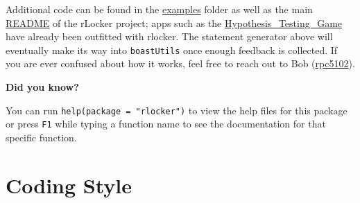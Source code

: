 \documentclass[
]{book}
\newenvironment{Shaded}{\begin{snugshade}}{\end{snugshade}}
\newcommand{\CommentTok}[1]{\textcolor[rgb]{0.56,0.35,0.01}{\textit{#1}}}
\newcommand{\DataTypeTok}[1]{\textcolor[rgb]{0.13,0.29,0.53}{#1}}
\newcommand{\KeywordTok}[1]{\textcolor[rgb]{0.13,0.29,0.53}{\textbf{#1}}}
\newcommand{\NormalTok}[1]{#1}
\newcommand{\OperatorTok}[1]{\textcolor[rgb]{0.81,0.36,0.00}{\textbf{#1}}}
\newcommand{\OtherTok}[1]{\textcolor[rgb]{0.56,0.35,0.01}{#1}}
\newcommand{\RegionMarkerTok}[1]{#1}
\newcommand{\StringTok}[1]{\textcolor[rgb]{0.31,0.60,0.02}{#1}}
\begin{document}
\begin{Shaded}
\end{Shaded}

Additional code can be found in the \href{https://github.com/rpc5102/rlocker/tree/master/inst/examples}{examples} folder as well as the main \href{https://github.com/rpc5102/rlocker/blob/master/README.md}{README} of the rLocker project; apps such as the \href{https://github.com/EducationShinyAppTeam/Hypothesis_Testing_Game}{Hypothesis\_Testing\_Game} have already been outfitted with rlocker. The statement generator above will eventually make its way into \texttt{boastUtils} once enough feedback is collected. If you are ever confused about how it works, feel free to reach out to Bob (\href{mailto:rpc5102@psu.edu}{rpc5102}).

\textbf{Did you know?}

You can run \texttt{help(package\ =\ "rlocker")} to view the help files for this package or press \texttt{F1} while typing a function name to see the documentation for that specific function.

\hypertarget{codingc}{%
\chapter{Coding Style}\label{codingc}}
\end{document}

